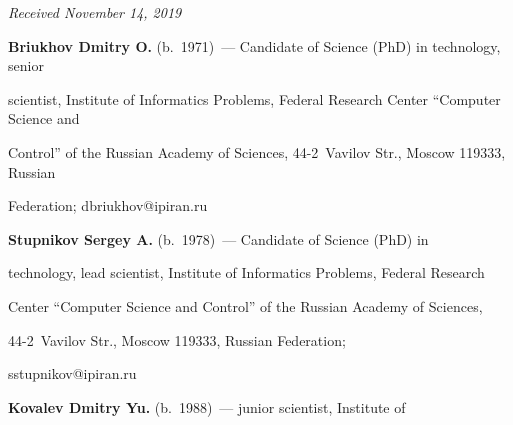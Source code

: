 




\hfill{\small\textit{Received November 14, 2019}}















\Contr





    \noindent


\textbf{Briukhov Dmitry O.} (b.\ 1971)~--- Candidate of Science (PhD) in technology, senior 


scientist, Institute of Informatics Problems, Federal Research Center ``Computer Science and 


Control'' of the Russian Academy of Sciences, 44-2~Vavilov Str., Moscow 119333, Russian 


Federation; \mbox{dbriukhov@ipiran.ru}


    


    \vspace*{3pt}


    


    \noindent


    \textbf{Stupnikov Sergey A.} (b.\ 1978)~--- Candidate of Science (PhD) in 


technology, lead scientist, Institute of Informatics Problems, Federal Research 


Center ``Computer Science and Control'' of the Russian Academy of Sciences,  


44-2~Vavilov Str., Moscow 119333, Russian Federation; 


\mbox{sstupnikov@ipiran.ru}


    


    \vspace*{3pt}


    


    \noindent


    \textbf{Kovalev Dmitry Yu.} (b.\ 1988)~--- junior scientist, Institute of 



